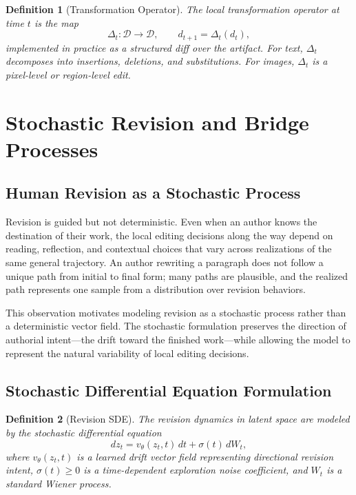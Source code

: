 \documentclass[12pt,a4paper]{article}
\theoremstyle{draftthm}
\newtheorem{definition}{Definition}[section]
\newcommand{\D}{\mathcal{D}}
\newcommand{\vtheta}{v_{\theta}}
\newcommand{\bW}{W}
\begin{document}
\begin{definition}[Transformation Operator]
  The local \emph{transformation operator} at time $t$ is the map
  \begin{equation}
    \Delta_t: \D \to \D, \qquad d_{t+1} = \Delta_t(d_t),
  \end{equation}
  implemented in practice as a structured diff over the artifact. For text, $\Delta_t$ decomposes into insertions, deletions, and substitutions. For images, $\Delta_t$ is a pixel-level or region-level edit.
\end{definition}

\section{Stochastic Revision and Bridge Processes}

\subsection{Human Revision as a Stochastic Process}

Revision is guided but not deterministic. Even when an author knows the destination of their work, the local editing decisions along the way depend on reading, reflection, and contextual choices that vary across realizations of the same general trajectory. An author rewriting a paragraph does not follow a unique path from initial to final form; many paths are plausible, and the realized path represents one sample from a distribution over revision behaviors.

This observation motivates modeling revision as a stochastic process rather than a deterministic vector field. The stochastic formulation preserves the direction of authorial intent---the drift toward the finished work---while allowing the model to represent the natural variability of local editing decisions.

\subsection{Stochastic Differential Equation Formulation}

\begin{definition}[Revision SDE]
  The revision dynamics in latent space are modeled by the stochastic differential equation
  \begin{equation}
    dz_t = \vtheta(z_t, t)\, dt + \sigma(t)\, d\bW_t,
    \label{eq:revision-sde}
  \end{equation}
  where $\vtheta(z_t, t)$ is a learned drift vector field representing directional revision intent, $\sigma(t) \geq 0$ is a time-dependent exploration noise coefficient, and $\bW_t$ is a standard Wiener process.
\end{definition}
\end{document}
